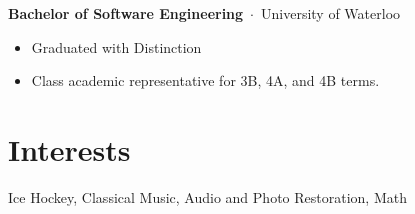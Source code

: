 \documentclass[oneside, 11pt]{memoir}
\newcommand{\entryEducation}[4]{
  \begin{adjustwidth}{0.3em}{0em}%
  \textbf{#1}~$\cdot$~#2\sourceatright{\Date \small #3}%
  \begin{adjustwidth}{0.5em}{2.75em}
    \begin{flushleft}
      {
        \Merriweather \small
        #4
      }%
    \end{flushleft}
  \end{adjustwidth}
  \end{adjustwidth}
}
\begin{document}
\entryEducation{Bachelor of Software Engineering}{University of Waterloo}{2022}{
    \begin{itemize}
        \itemsep 0.3em
        \item {
            Graduated with Distinction
        }
        \item {
            Class academic representative for 3B, 4A, and 4B terms.
        }
    \end{itemize}
}

\section*{Interests}
{
    \Merriweather \small \quad \quad \quad Ice Hockey, Classical Music, Audio and Photo Restoration, Math
}


%
\end{document}
